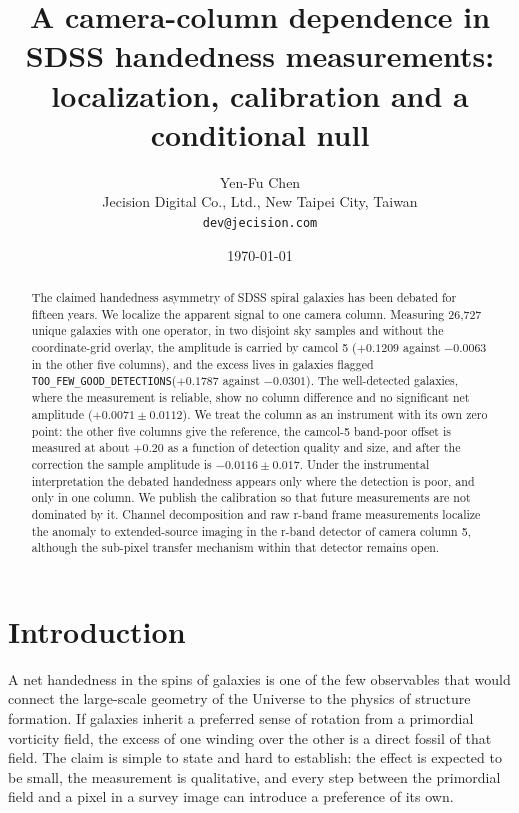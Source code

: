 \documentclass[11pt]{article}
\title{A camera-column dependence in SDSS handedness measurements: localization, calibration and a conditional null}
\author{Yen-Fu Chen\\
\small Jecision Digital Co., Ltd., New Taipei City, Taiwan\\
\small \texttt{dev@jecision.com}}
\date{\today}
\newcommand{\toofew}{\texttt{TOO\_\allowbreak FEW\_\allowbreak GOOD\_\allowbreak DETECTIONS}}
\begin{document}
\maketitle

\begin{abstract}
The claimed handedness asymmetry of SDSS spiral galaxies has been debated for fifteen years. We
localize the apparent signal to one camera column.
Measuring 26,727 unique galaxies with one operator, in two disjoint sky samples and without the
coordinate-grid overlay, the amplitude is carried by camcol 5 ($+0.1209$ against
$-0.0063$ in the other five columns), and the excess lives in galaxies flagged
\toofew ($+0.1787$ against $-0.0301$). The well-detected galaxies, where the
measurement is reliable, show no column difference and no significant net amplitude ($+0.0071 \pm 0.0112$). We
treat the column as an instrument with its own zero point: the other five columns give the
reference, the camcol-5 band-poor offset is measured at about $+0.20$ as a function of detection
quality and size, and after the correction the sample amplitude is $-0.0116 \pm 0.017$. Under the instrumental interpretation the debated
handedness appears only where the detection is
poor, and only in one column. We publish the calibration so that future measurements are not
dominated by it. Channel decomposition and raw r-band frame measurements localize the anomaly to extended-source
imaging in the r-band detector of camera column 5, although the sub-pixel transfer mechanism
within that detector remains open.
\end{abstract}

\section{Introduction}

A net handedness in the spins of galaxies is one of the few observables that would connect the
large-scale geometry of the Universe to the physics of structure formation. If galaxies inherit a
preferred sense of rotation from a primordial vorticity field, the excess of one winding over the
other is a direct fossil of that field. The claim is simple to state and hard to establish: the
effect is expected to be small, the measurement is qualitative, and every step between the
primordial field and a pixel in a survey image can introduce a preference of its own.
\end{document}
